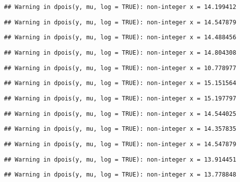 \documentclass[
]{article}
\begin{document}
\begin{verbatim}
## Warning in dpois(y, mu, log = TRUE): non-integer x = 14.199412
\end{verbatim}

\begin{verbatim}
## Warning in dpois(y, mu, log = TRUE): non-integer x = 14.547879
\end{verbatim}

\begin{verbatim}
## Warning in dpois(y, mu, log = TRUE): non-integer x = 14.488456
\end{verbatim}

\begin{verbatim}
## Warning in dpois(y, mu, log = TRUE): non-integer x = 14.804308
\end{verbatim}

\begin{verbatim}
## Warning in dpois(y, mu, log = TRUE): non-integer x = 10.778977
\end{verbatim}

\begin{verbatim}
## Warning in dpois(y, mu, log = TRUE): non-integer x = 15.151564
\end{verbatim}

\begin{verbatim}
## Warning in dpois(y, mu, log = TRUE): non-integer x = 15.197797
\end{verbatim}

\begin{verbatim}
## Warning in dpois(y, mu, log = TRUE): non-integer x = 14.544025
\end{verbatim}

\begin{verbatim}
## Warning in dpois(y, mu, log = TRUE): non-integer x = 14.357835
\end{verbatim}

\begin{verbatim}
## Warning in dpois(y, mu, log = TRUE): non-integer x = 14.547879
\end{verbatim}

\begin{verbatim}
## Warning in dpois(y, mu, log = TRUE): non-integer x = 13.914451
\end{verbatim}

\begin{verbatim}
## Warning in dpois(y, mu, log = TRUE): non-integer x = 13.778848
\end{verbatim}
\end{document}
